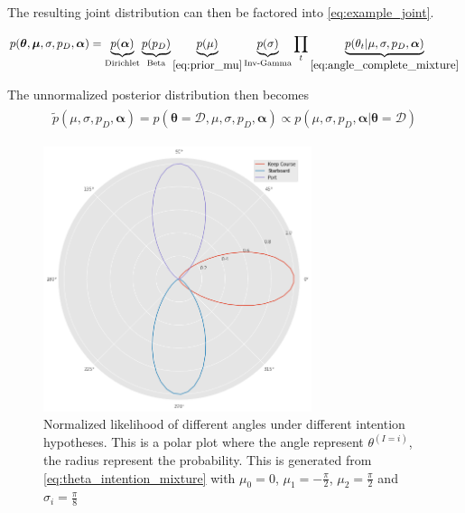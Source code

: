 The resulting joint distribution  can then be factored into \cref{eq:example_joint}.

\begin{align}\label{eq:example_joint}
\begin{split}
    p(\boldsymbol{\theta}, \boldsymbol{\mu}, \sigma, p_D, \boldsymbol{\alpha}) =\underbrace{p(\boldsymbol{\alpha})}_{\text{Dirichlet}}\underbrace{p(p_D)}_{\text{Beta}}\underbrace{p(\mu)}_{\eqref{eq:prior_mu}} \underbrace{p(\sigma)}_{\text{Inv-Gamma}} \prod_t \underbrace{p(\theta_t | \mu, \sigma, p_D, \boldsymbol{\alpha})}_{\eqref{eq:angle_complete_mixture}}
\end{split}
\end{align}

The unnormalized posterior distribution then becomes
\begin{align}\label{eq:example_unnormalized_posterior}
\begin{split}
    \tilde{p}(\mu, \sigma, p_D, \boldsymbol{\alpha}) =  p(\boldsymbol{\theta} = \mathcal{D}, \mu, \sigma, p_D, \boldsymbol{\alpha}) \propto p(\mu, \sigma, p_D, \boldsymbol{\alpha} | \boldsymbol{\theta}= \mathcal{D})
\end{split}
\end{align}


\begin{figure}
    \centering
    \includegraphics[width=0.7\textwidth]{figures/intention_angle.png}
    \caption{Normalized likelihood of different angles under different intention hypotheses. This is a polar plot where the angle represent $\theta^{(I=i)}$, the radius represent the probability. This is generated from \cref{eq:theta_intention_mixture} with $\mu_0=0$, $\mu_1 = -\frac{\pi}{2}$, $\mu_2=\frac{\pi}{2}$ and $\sigma_i=\frac{\pi}{8}$}
    \label{fig:intention_angle}
\end{figure}

